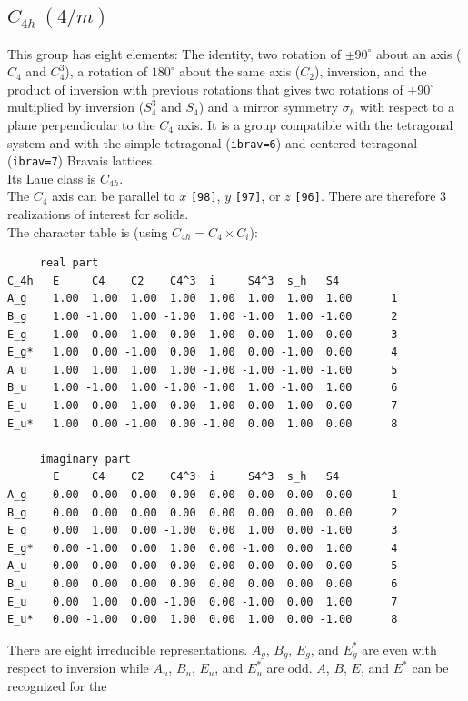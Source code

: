 \documentclass[12pt,a4paper]{article}
\begin{document}
\newpage
\subsection{\color{web-blue}$C_{4h}\ (4/m)$}  
This group has eight elements: The identity, two rotation of $\pm90^\circ$ 
about an axis ($C_4$ and $C_4^3$), a rotation of $180^\circ$ about the
same axis ($C_2$), inversion, and the product of inversion with previous
rotations that gives two rotations of $\pm90^\circ$ multiplied by inversion 
($S_4^3$ and $S_4$) and a mirror symmetry $\sigma_h$ with respect to a plane 
perpendicular to the $C_4$ axis.  
It is a group compatible with the tetragonal system and with the  
simple tetragonal (\texttt{ibrav=6}) and centered tetragonal (\texttt{ibrav=7})
Bravais lattices. \\ 
Its Laue class is $C_{4h}$. \\
The $C_4$ axis can be parallel to $x$ \texttt{[98]}, $y$ \texttt{[97]}, 
or $z$ \texttt{[96]}. There are therefore
$3$ realizations of interest for solids. \\
The character table is (using $C_{4h}=C_4 \times C_i$):
\begin{verbatim}
     real part
C_4h   E     C4    C2    C4^3  i     S4^3  s_h   S4   
A_g    1.00  1.00  1.00  1.00  1.00  1.00  1.00  1.00      1
B_g    1.00 -1.00  1.00 -1.00  1.00 -1.00  1.00 -1.00      2
E_g    1.00  0.00 -1.00  0.00  1.00  0.00 -1.00  0.00      3
E_g*   1.00  0.00 -1.00  0.00  1.00  0.00 -1.00  0.00      4
A_u    1.00  1.00  1.00  1.00 -1.00 -1.00 -1.00 -1.00      5
B_u    1.00 -1.00  1.00 -1.00 -1.00  1.00 -1.00  1.00      6
E_u    1.00  0.00 -1.00  0.00 -1.00  0.00  1.00  0.00      7
E_u*   1.00  0.00 -1.00  0.00 -1.00  0.00  1.00  0.00      8

     imaginary part
       E     C4    C2    C4^3  i     S4^3  s_h   S4   
A_g    0.00  0.00  0.00  0.00  0.00  0.00  0.00  0.00      1
B_g    0.00  0.00  0.00  0.00  0.00  0.00  0.00  0.00      2
E_g    0.00  1.00  0.00 -1.00  0.00  1.00  0.00 -1.00      3
E_g*   0.00 -1.00  0.00  1.00  0.00 -1.00  0.00  1.00      4
A_u    0.00  0.00  0.00  0.00  0.00  0.00  0.00  0.00      5
B_u    0.00  0.00  0.00  0.00  0.00  0.00  0.00  0.00      6
E_u    0.00  1.00  0.00 -1.00  0.00 -1.00  0.00  1.00      7
E_u*   0.00 -1.00  0.00  1.00  0.00  1.00  0.00 -1.00      8
\end{verbatim}
There are eight irreducible representations. $A_g$, $B_g$, $E_g$, and
$E_g^*$ are even with respect to inversion while $A_u$, $B_u$, $E_u$,
and $E_u^*$ are odd. $A$, $B$, $E$, and $E^*$ can be recognized for the
\end{document}
